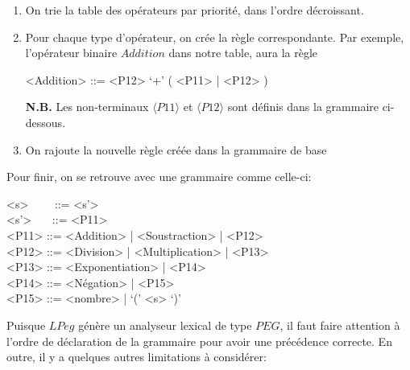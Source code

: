 \documentclass{article}
\begin{document}
\begin{enumerate}
	\item On trie la table des opérateurs par priorité, dans l'ordre décroissant.
	\item Pour chaque type d'opérateur, on crée la règle correspondante. Par exemple, l'opérateur binaire $Addition$ dans notre table, aura la règle
	\begin{grammar}
		<Addition> ::= <P12> `+' ( <P11> | <P12> )
	\end{grammar}
	\textbf{N.B.} Les non-terminaux $\langle P11 \rangle$ et $\langle P12 \rangle$ sont définis dans la grammaire ci-dessous.
	\item On rajoute la nouvelle règle créée dans la grammaire de base
\end{enumerate}
Pour finir, on se retrouve avec une grammaire comme celle-ci:
\begin{grammar}
<s> \ \ \ \ ::= <s'>\\
<s'> \ \ \ ::= <P11>\\
<P11> ::= <Addition> | <Soustraction> | <P12>\\
<P12> ::= <Division> | <Multiplication> | <P13>\\
<P13> ::= <Exponentiation> | <P14>\\
<P14> ::= <Négation> | <P15>\\
<P15> ::= <nombre> | `(' <s> `)'
\end{grammar}
Puisque $LPeg$ génère un analyseur lexical de type $PEG$, il faut faire attention à l'ordre de déclaration de la grammaire pour avoir une précédence correcte. En outre, il y a quelques autres limitations à considérer:
\end{document}
